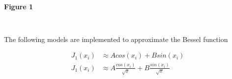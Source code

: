 \documentclass[a4paper, 11pt, margin= 1.25cm ]{article}
\begin{document}
    \begin{center}
    \\
    \textbf{Figure 1}
    \end{center}
    { \hspace*{\fill} \\}
    \begin{multicols}{2}
    
    The following models are implemented to approximate the Bessel function

\begin{align}
J_1(x_i) &\approx Acos(x_i) + Bsin(x_i)\\
J_1(x_i) &\approx A\frac{cos(x_i)}{\sqrt{x}} + B\frac{sin(x_i)}{\sqrt{x}}
\end{align}
    \end{multicols}
\end{document}
